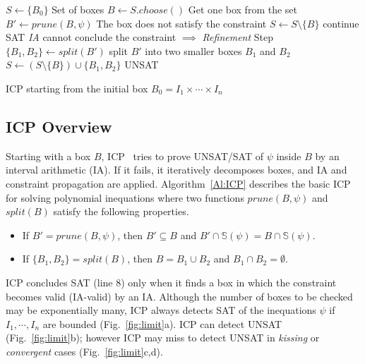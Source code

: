 \documentclass[runningheads,a4paper,oribibl]{llncs}
\begin{document}
\begin{algorithm}
\begin{algorithmic}[1]
\State $S \gets \{B_0\}$ \Comment Set of boxes
  \State $B \gets S.choose()$ \Comment Get one box from the set
  \State $B' \gets prune(B, \psi)$
   \Comment The box does not satisfy the constraint
  	\State $S \gets S \setminus \{B\}$
  	\State continue
  	\State \Return SAT
  \Else \Comment \emph{IA} cannot conclude the constraint $\implies$ \emph{Refinement} Step
  	\State $\{B_1, B_2\} \gets split(B')$ \Comment split $B'$ into two smaller boxes $B_1$ and $B_2$	
  	\State $S \gets (S \setminus \{B\}) \cup \{B_1, B_2\}$
  \EndIf
\EndWhile
\State \Return UNSAT
\end{algorithmic}
\caption{ICP starting from the initial box $B_0 = I_1 \times \cdots \times I_n$}
\label{Al:ICP}
\end{algorithm}


\subsection{ICP Overview}

\sloppy  
Starting with a box $B$, ICP~\cite{benhamou:hal-00480814} tries to prove
UNSAT/SAT of $\psi$ inside $B$ by an interval arithmetic (IA).
If it fails, it iteratively decomposes boxes, and IA and constraint propagation are applied. 
Algorithm~\ref{Al:ICP} describes the basic ICP for solving polynomial inequations
where two functions $prune(B,\psi)$ and $split(B)$ satisfy the following properties.
\begin{itemize}
\item If $B' = prune (B, \psi)$,
  then $B' \subseteq B $ and $ B' \cap \mathbb{S}(\psi) = B \cap \mathbb{S}(\psi)$. 
\item If $\{B_1, B_2\} = split (B)$,
  then $B = B_1 \cup B_2$ and $B_1 \cap B_2 = \emptyset$. 
\end{itemize}

ICP concludes SAT (line 8) only when it finds a box
in which the constraint becomes valid (IA-valid) by an IA. 
Although the number of boxes to be checked may be exponentially many, 
ICP always detects SAT of the inequations $\psi$
if $I_1, \cdots, I_n$ are bounded (Fig.~\ref{fig:limit}a). 
ICP can detect UNSAT (Fig.~\ref{fig:limit}b); however 
ICP may miss to detect UNSAT in \emph{kissing} or 
\emph{convergent} cases (Fig.~\ref{fig:limit}c,d).
\end{document}
